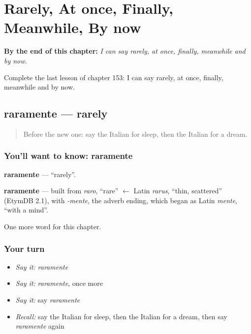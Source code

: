
\chapter{Rarely, At once, Finally, Meanwhile, By now}
\label{ch:it-rarely-at-once-finally-meanwhile-by-now}

\begin{chapteropening}
\textbf{By the end of this chapter:} \emph{I can say rarely, at once, finally, meanwhile and by now.}

Complete the last lesson of chapter 153: I can say rarely, at once, finally, meanwhile and by now.
\end{chapteropening}

\section[raramente]{raramente — rarely}

\label{lesson:IT-C153-raramente}



\begin{quote}
Before the new one: say the Italian for sleep, then the Italian for a dream.
\end{quote}

\subsection*{You'll want to know: raramente}
\textbf{raramente} — \textquotedblleft{}rarely\textquotedblright{}.

\begin{cousinweb}
\textbf{raramente} — built from \emph{raro}, \textquotedblleft{}rare\textquotedblright{} $\leftarrow$ Latin \emph{rarus}, \textquotedblleft{}thin, scattered\textquotedblright{} (EtymDB 2.1), with \emph{-mente}, the adverb ending, which began as Latin \emph{mente}, \textquotedblleft{}with a mind\textquotedblright{}.
\end{cousinweb}

\begin{grammarlens}[title={What you've built}]
One more word for this chapter.
\end{grammarlens}

\subsection*{Your turn}
\begin{itemize}
\raggedright
  \item \emph{Say it:} \emph{raramente}
  \item \emph{Say it:} \emph{raramente}, once more
  \item \emph{Say it:} say \emph{raramente}
  \item \emph{Recall:} say the Italian for sleep, then the Italian for a dream, then say \emph{raramente} again
\end{itemize}

